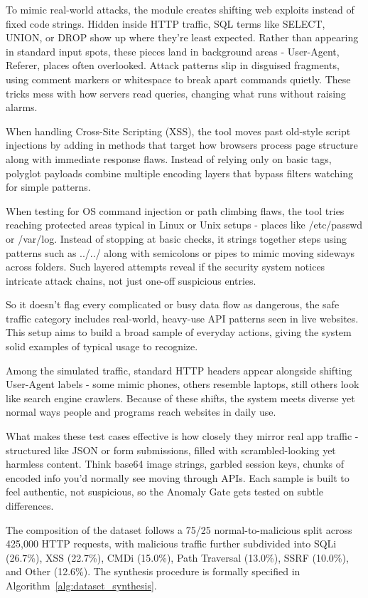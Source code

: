 \documentclass[journal,onecolumn]{IEEEtran}
\begin{document}
To mimic real-world attacks, the module creates shifting web exploits instead of fixed code strings. Hidden inside HTTP traffic, SQL terms like SELECT, UNION, or DROP show up where they're least expected. Rather than appearing in standard input spots, these pieces land in background areas - User-Agent, Referer, places often overlooked. Attack patterns slip in disguised fragments, using comment markers or whitespace to break apart commands quietly. These tricks mess with how servers read queries, changing what runs without raising alarms.

When handling Cross-Site Scripting (XSS), the tool moves past old-style script injections by adding in methods that target how browsers process page structure along with immediate response flaws. Instead of relying only on basic tags, polyglot payloads combine multiple encoding layers that bypass filters watching for simple patterns.

When testing for OS command injection or path climbing flaws, the tool tries reaching protected areas typical in Linux or Unix setups - places like /etc/passwd or /var/log. Instead of stopping at basic checks, it strings together steps using patterns such as ../../ along with semicolons or pipes to mimic moving sideways across folders. Such layered attempts reveal if the security system notices intricate attack chains, not just one-off suspicious entries.

So it doesn't flag every complicated or busy data flow as dangerous, the safe traffic category includes real-world, heavy-use API patterns seen in live websites. This setup aims to build a broad sample of everyday actions, giving the system solid examples of typical usage to recognize.

Among the simulated traffic, standard HTTP headers appear alongside shifting User-Agent labels - some mimic phones, others resemble laptops, still others look like search engine crawlers. Because of these shifts, the system meets diverse yet normal ways people and programs reach websites in daily use.

What makes these test cases effective is how closely they mirror real app traffic - structured like JSON or form submissions, filled with scrambled-looking yet harmless content. Think base64 image strings, garbled session keys, chunks of encoded info you'd normally see moving through APIs. Each sample is built to feel authentic, not suspicious, so the Anomaly Gate gets tested on subtle differences.

The composition of the dataset follows a 75/25 normal-to-malicious split across 425,000 HTTP requests, with malicious traffic further subdivided into SQLi (26.7\%), XSS (22.7\%), CMDi (15.0\%), Path Traversal (13.0\%), SSRF (10.0\%), and Other (12.6\%). The synthesis procedure is formally specified in Algorithm~\ref{alg:dataset_synthesis}.
\end{document}
